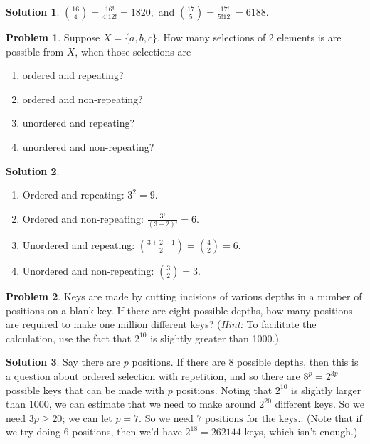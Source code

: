\documentclass{article}
\numberwithin{equation}{section}
\theoremstyle{plain}
\theoremstyle{definition}
\newtheorem{problem}{Problem}
\newtheorem*{solution*}{Solution}
\begin{document}
\begin{solution*}
	$\boxed{\displaystyle \binom{16}4 = \frac{16!}{4!12!} = 1820,}$ and $\boxed{ \binom{17}5 = \frac{17!}{5!12!} = 6188.}$
\end{solution*}


\begin{problem}
	Suppose $X = \{a,b,c\}$. How many selections of 2 elements is are possible from $X$, when those selections are
	\begin{enumerate}[label=(\alph*)]
		\item ordered and repeating? 
		\item ordered and non-repeating?
		\item unordered and repeating? 
		\item unordered and non-repeating? 
	\end{enumerate}
\end{problem}

\begin{solution*}
	\begin{enumerate}[label=(\alph*)]
		\item Ordered and repeating: $3^2 = \boxed 9$. 
		\item Ordered and non-repeating: $\frac{3!}{(3-2)!} = \boxed 6$.
		\item Unordered and repeating: $\binom{3+2-1}{2} = \binom 4 2 = \boxed{6}$. 
		\item Unordered and non-repeating: $\binom{3}{2} = \boxed 3$. 
	\end{enumerate}
\end{solution*}

\begin{problem}
	Keys are made by cutting incisions of various depths in a number of positions on a blank key. If there are eight possible depths, how many positions are required to make one million different keys? (\emph{Hint:} To facilitate the calculation, use the fact that $2^{10}$ is slightly greater than 1000.) 
\end{problem}

\begin{solution*}
	Say there are $p$ positions. If there are 8 possible depths, then this is a question about ordered selection with repetition, and so there are $8^p = 2^{3p}$ possible keys that can be made with $p$ positions. Noting that $2^{10}$ is slightly larger than 1000, we can estimate that we need to make around $2^{20}$ different keys. So we need $3p \geq 20$; we can let $p = 7$. So we need $\boxed{7 \textrm{ positions for the keys.}}$. (Note that if we try doing 6 positions, then we'd have $2^{18} = 262144$ keys, which isn't enough.)
\end{solution*}
\end{document}
